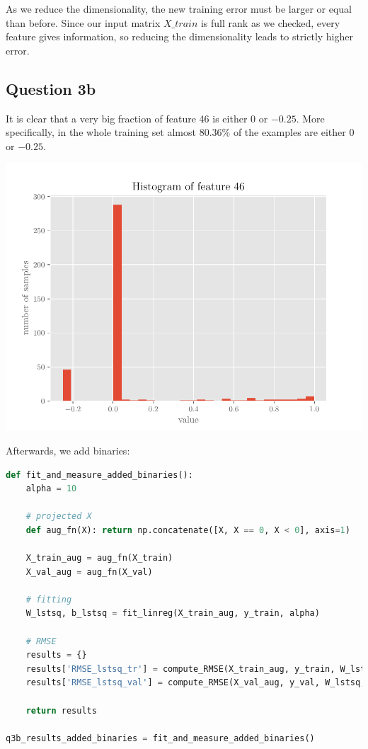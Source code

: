 \documentclass{article}
\begin{document}
As we reduce the dimensionality, the new training error must be larger or equal than before. Since our input matrix $X\_train$ is full rank as we checked, every feature gives information, so reducing the dimensionality leads to strictly higher error.


\subsection*{Question 3b}

It is clear that a very big fraction of feature 46 is either $0$ or $-0.25$. More specifically, in the whole training set almost $80.36\%$ of the examples are either $0$ or $-0.25$.

\includegraphics[scale=0.75]{fig_01.pdf}


Afterwards, we add binaries:

\begin{lstlisting}[language=Python]
def fit_and_measure_added_binaries():
    alpha = 10

    # projected X
    def aug_fn(X): return np.concatenate([X, X == 0, X < 0], axis=1)

    X_train_aug = aug_fn(X_train)
    X_val_aug = aug_fn(X_val)

    # fitting
    W_lstsq, b_lstsq = fit_linreg(X_train_aug, y_train, alpha)
    
    # RMSE
    results = {}
    results['RMSE_lstsq_tr'] = compute_RMSE(X_train_aug, y_train, W_lstsq, b_lstsq)
    results['RMSE_lstsq_val'] = compute_RMSE(X_val_aug, y_val, W_lstsq, b_lstsq)
    
    return results

q3b_results_added_binaries = fit_and_measure_added_binaries()
\end{lstlisting}
\end{document}
